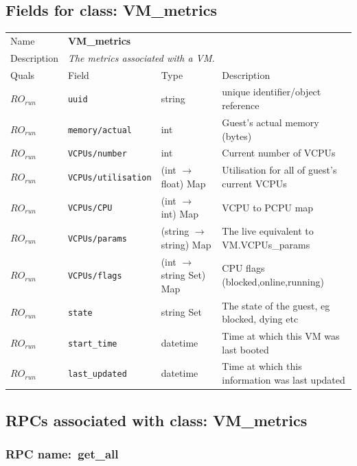 \subsection{Fields for class: VM\_metrics}
\begin{longtable}{|lllp{}|}
\hline
\multicolumn{1}{|l}{Name} & \multicolumn{3}{l|}{\bf VM\_metrics} \\
\multicolumn{1}{|l}{Description} & \multicolumn{3}{l|}{\parbox{11cm}{\em
The metrics associated with a VM.}} \\
\hline
Quals & Field & Type & Description \\
\hline
$\mathit{RO}_\mathit{run}$ &  {\tt uuid} & string & unique identifier/object reference \\
$\mathit{RO}_\mathit{run}$ &  {\tt memory/actual} & int & Guest's actual memory (bytes) \\
$\mathit{RO}_\mathit{run}$ &  {\tt VCPUs/number} & int & Current number of VCPUs \\
$\mathit{RO}_\mathit{run}$ &  {\tt VCPUs/utilisation} & (int $\rightarrow$ float) Map & Utilisation for all of guest's current VCPUs \\
$\mathit{RO}_\mathit{run}$ &  {\tt VCPUs/CPU} & (int $\rightarrow$ int) Map & VCPU to PCPU map \\
$\mathit{RO}_\mathit{run}$ &  {\tt VCPUs/params} & (string $\rightarrow$ string) Map & The live equivalent to VM.VCPUs\_params \\
$\mathit{RO}_\mathit{run}$ &  {\tt VCPUs/flags} & (int $\rightarrow$ string Set) Map & CPU flags (blocked,online,running) \\
$\mathit{RO}_\mathit{run}$ &  {\tt state} & string Set & The state of the guest, eg blocked, dying etc \\
$\mathit{RO}_\mathit{run}$ &  {\tt start\_time} & datetime & Time at which this VM was last booted \\
$\mathit{RO}_\mathit{run}$ &  {\tt last\_updated} & datetime & Time at which this information was last updated \\
\hline
\end{longtable}
\subsection{RPCs associated with class: VM\_metrics}
\subsubsection{RPC name:~get\_all}

